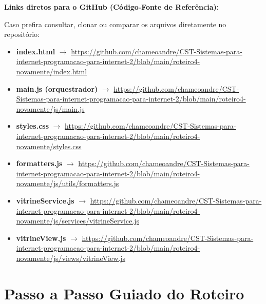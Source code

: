 \begin{tcolorbox}[
    colback=azulTitulo!5, colframe=azulTitulo!80,
    boxrule=0.8pt, arc=4pt, left=10pt, right=10pt, top=6pt, bottom=6pt
]
\textbf{\color{azulTitulo}Links diretos para o GitHub (Código-Fonte de Referência):}

Caso prefira consultar, clonar ou comparar os arquivos diretamente no repositório:
\begin{itemize}[leftmargin=*, nosep]
  \item \textbf{index.html} $\rightarrow$ {\small\url{https://github.com/chameoandre/CST-Sistemas-para-internet-programacao-para-internet-2/blob/main/roteiro4-novamente/index.html}}
  \item \textbf{main.js (orquestrador)} $\rightarrow$ {\small\url{https://github.com/chameoandre/CST-Sistemas-para-internet-programacao-para-internet-2/blob/main/roteiro4-novamente/js/main.js}}
  \item \textbf{styles.css} $\rightarrow$ {\small\url{https://github.com/chameoandre/CST-Sistemas-para-internet-programacao-para-internet-2/blob/main/roteiro4-novamente/styles.css}}
  \item \textbf{formatters.js} $\rightarrow$ {\small\url{https://github.com/chameoandre/CST-Sistemas-para-internet-programacao-para-internet-2/blob/main/roteiro4-novamente/js/utils/formatters.js}}
  \item \textbf{vitrineService.js} $\rightarrow$ {\small\url{https://github.com/chameoandre/CST-Sistemas-para-internet-programacao-para-internet-2/blob/main/roteiro4-novamente/js/services/vitrineService.js}}
  \item \textbf{vitrineView.js} $\rightarrow$ {\small\url{https://github.com/chameoandre/CST-Sistemas-para-internet-programacao-para-internet-2/blob/main/roteiro4-novamente/js/views/vitrineView.js}}
\end{itemize}
\end{tcolorbox}


\clearpage
\section{Passo a Passo Guiado do Roteiro}\label{sec:m3a}

